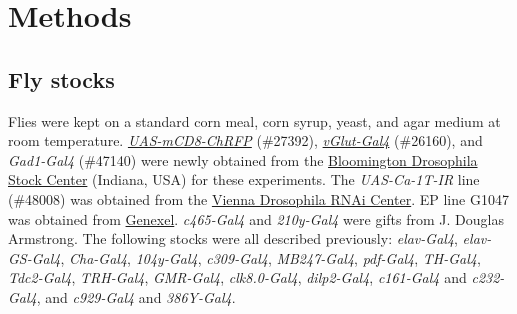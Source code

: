 \section*{Methods}

\subsection*{Fly stocks}

Flies were kept on a standard corn meal, corn syrup, yeast, and agar medium at room temperature.
\href{http://flystocks.bio.indiana.edu/Reports/27392.html}{\emph{UAS-mCD8-ChRFP}} (\#27392), \href{http://flystocks.bio.indiana.edu/Reports/26160.html}{\emph{vGlut-Gal4}} (\#26160), and \emph{Gad1-Gal4} (\#47140) were newly obtained from the \href{http://flystocks.bio.indiana.edu}{Bloomington Drosophila Stock Center} (Indiana, USA) for these experiments.
The \emph{UAS-Ca-\alpha1T-IR} line (\#48008) was obtained from the \href{http://stockcenter.vdrc.at}{Vienna Drosophila RNAi Center}.
EP line G1047 was obtained from \href{http://genexel.kaist.ac.kr}{Genexel}.
\emph{c465-Gal4} and \emph{210y-Gal4} were gifts from J. Douglas Armstrong\cite{Young:2010jq}.
The following stocks were all described previously: \emph{elav-Gal4}\cite{Lin:1994vn}, \emph{elav-GS-Gal4}\cite{Osterwalder:2001cl}, \emph{Cha-Gal4}\cite{Kitamoto:2001ue}, \emph{104y-Gal4}\cite{sakai:2006aa}, \emph{c309-Gal4}\cite{connolly:1996aa}, \emph{MB247-Gal4}\cite{zars:2000aa}, \emph{pdf-Gal4}\cite{renn:1999ab}, \emph{TH-Gal4}\cite{friggi-grelin:2003aa}, \emph{Tdc2-Gal4}\cite{alekseyenko:2010aa}, \emph{TRH-Gal4}\cite{alekseyenko:2010aa}, \emph{GMR-Gal4}\cite{freeman:1996aa},  \emph{clk8.0-Gal4}\cite{glossop:2003aa}, \emph{dilp2-Gal4}\cite{Rulifson:2002cg}, \emph{c161-Gal4} and \emph{c232-Gal4}\cite{renn:1999aa}, and \emph{c929-Gal4} and \emph{386Y-Gal4}\cite{taghert:2001aa}.
